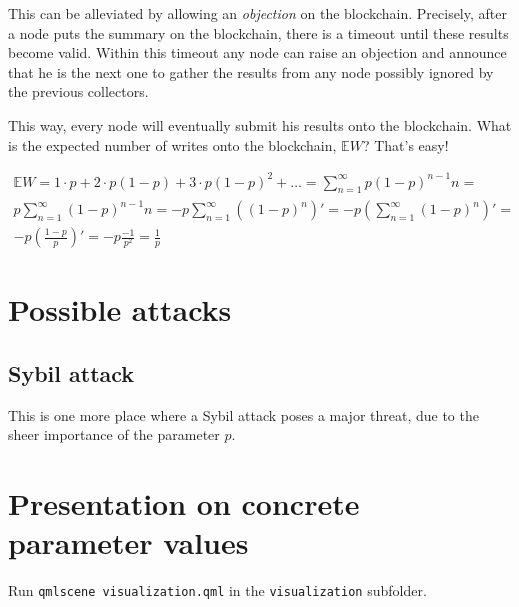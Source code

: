 \documentclass[12pt]{article}
\begin{document}
This can be alleviated by allowing an \textit{objection} on the blockchain.
Precisely, after a node puts the summary on the blockchain, there is a 
timeout until these results become valid. Within this timeout any node can
raise an objection and announce that he is the next one to gather the results
from any node possibly ignored by the previous collectors.

This way, every node will eventually submit his results onto the blockchain.
What is the expected number of writes onto the blockchain, $\mathbb{E}W$? That's easy!

\begin{multline}
\mathbb{E}W = 1 \cdot p + 2 \cdot p (1-p) + 3 \cdot p (1-p)^2 + \dots = \sum_{n=1}^{\infty} p (1-p)^{n-1} n = \\
p \sum_{n=1}^{\infty} (1-p)^{n-1} n = -p \sum_{n=1}^{\infty} \left((1-p)^n\right)' = -p \left( \sum_{n=1}^{\infty}(1-p)^n\right)' = \\
-p \left(\frac{1-p}{p}\right)' = -p \frac{-1}{p^2} = \frac{1}{p}
\end{multline}
\section{Possible attacks}
\subsection{Sybil attack}
This is one more place where a Sybil attack poses a major threat, due to the sheer
importance of the parameter $p$.
 
\section{Presentation on concrete parameter values}
Run \texttt{qmlscene visualization.qml} in the \texttt{visualization} subfolder.
\end{document}
